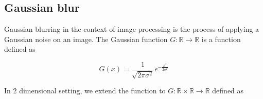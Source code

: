 \documentclass[pdftex,12pt,a4paper]{report}
\begin{document}


\subsection{Gaussian blur}
\label{subsection:gaussian_blur}

Gaussian blurring in the context of image processing is the process of applying a Gaussian noise on an image. The Gaussian function $G: \mathbb{R} \rightarrow \mathbb{R}$ is a function defined as

$$
G(x) = \frac{1}{\sqrt{2\pi \sigma^2}} e^{-\frac{x^2}{2 \sigma^2}}
$$

In 2 dimensional setting, we extend the function to $G: \mathbb{R} \times \mathbb{R} \rightarrow \mathbb{R}$ defined as
\end{document}
